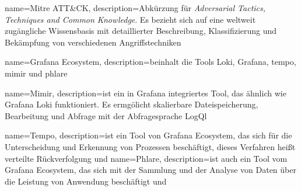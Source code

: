 




 {
    name={Mitre ATT\&CK},
    description={Abkürzung für \textit{Adversarial Tactics, Techniques and Common Knowledge}. Es bezieht sich auf eine weltweit zugängliche Wissensbasis mit detaillierter Beschreibung, Klassifizierung und Bekämpfung von verschiedenen Angriffstechniken \citep{Mitre_Definition}}}

 {
    name={Grafana Ecosystem},
    description={beinhalt die Tools Loki, Grafana, \gls{tempo}, \gls{mimir} und \gls{phlare} \citep{Grafana_Agents}}   
}

 {
    name={Mimir},
    description={ist ein in Grafana integriertes Tool, das ähnlich wie Grafana Loki funktioniert. Es ermgölicht skalierbare Dateispeicherung, Bearbeitung und Abfrage mit der Abfragesprache LogQl \citep{Grafana_mimir}}   
}

 {
    name={Tempo},
    description={ist ein Tool von Grafana Ecosystem, das sich für die Unterscheidung und Erkennung von Prozessen beschäftigt, dieses Verfahren heißt verteilte Rückverfolgung \citep{Grafana_tempo} und \citep{DevInsider_DistributedTracing}}   
}
 {
    name={Phlare},
    description={ist auch ein Tool vom Grafana Ecosystem, das sich mit der Sammlung und der Analyse von Daten über die Leistung von Anwendung beschäftigt \citep{Grafana_Phlare} und \citep{Salinger_Profiling}}   
}

